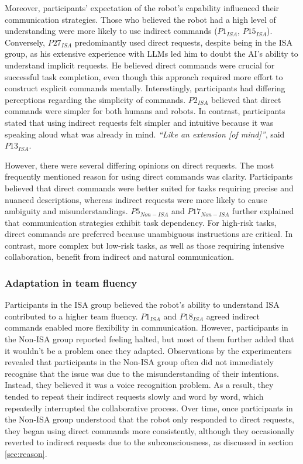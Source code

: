 Moreover, participants' expectation of the robot's capability influenced their communication strategies. Those who believed the robot had a high level of understanding were more likely to use indirect commands ($P1_{ISA}$, $P15_{ISA}$). Conversely, $P27_{ISA}$ predominantly used direct requests, despite being in the ISA group, as his extensive experience with LLMs led him to doubt the AI's ability to understand implicit requests. He believed direct commands were crucial for successful task completion, even though this approach required more effort to construct explicit commands mentally. Interestingly, participants had differing perceptions regarding the simplicity of commands. $P2_{ISA}$ believed that direct commands were simpler for both humans and robots. In contrast, participants stated that using indirect requests felt simpler and intuitive because it was speaking aloud what was already in mind. \textit{``Like an extension [of mind]''}, said $P13_{ISA}$.

However, there were several differing opinions on direct requests. The most frequently mentioned reason for using direct commands was clarity. Participants believed that direct commands were better suited for tasks requiring precise and nuanced descriptions, whereas indirect requests were more likely to cause ambiguity and misunderstandings. $P5_{Non-ISA}$ and $P17_{Non-ISA}$ further explained that communication strategies exhibit task dependency. For high-risk tasks, direct commands are preferred because unambiguous instructions are critical. In contrast, more complex but low-risk tasks, as well as those requiring intensive collaboration, benefit from indirect and natural communication.

\subsubsection{Adaptation in team fluency}
Participants in the ISA group believed the robot's ability to understand ISA contributed to a higher team fluency. $P1_{ISA}$ and $P18_{ISA}$ agreed indirect commands enabled more flexibility in communication. However, participants in the Non-ISA group reported feeling halted, but most of them further added that it wouldn't be a problem once they adapted. Observations by the experimenters revealed that participants in the Non-ISA group often did not immediately recognise that the issue was due to the misunderstanding of their intentions. Instead, they believed it was a voice recognition problem. As a result, they tended to repeat their indirect requests slowly and word by word, which repeatedly interrupted the collaborative process. Over time, once participants in the Non-ISA group understood that the robot only responded to direct requests, they began using direct commands more consistently, although they occasionally reverted to indirect requests due to the subconsciousness, as discussed in section \ref{sec:reason}. 

